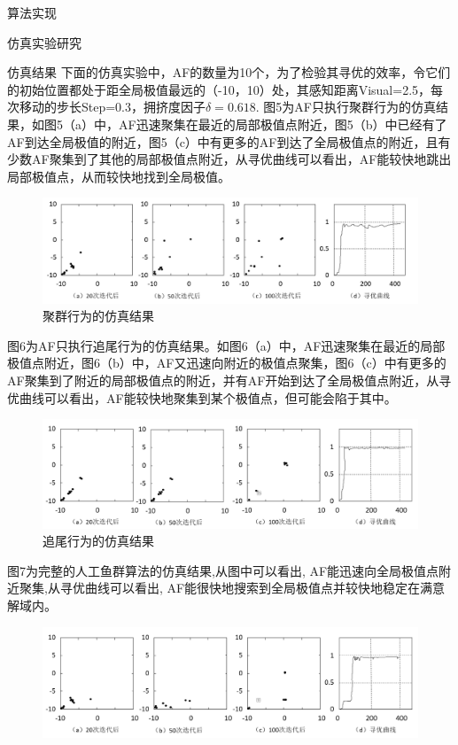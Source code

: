 \documentclass[UTF8]{ctexart}
\begin{document}
\begin{section}{算法实现}
\begin{subsection}{仿真实验研究}
\begin{subsubsection}{仿真结果}
	下面的仿真实验中，AF的数量为10个，为了检验其寻优的效率，令它们的初始位置都处于距全局极值最远的（-10，10）处，其感知距离Visual=2.5，每次移动的步长Step=0.3，拥挤度因子$\delta = 0.618$.
图5为AF只执行聚群行为的仿真结果，如图5（a）中，AF迅速聚集在最近的局部极值点附近，图5（b）中已经有了AF到达全局极值的附近，图5（c）中有更多的AF到达了全局极值点的附近，且有少数AF聚集到了其他的局部极值点附近，从寻优曲线可以看出，AF能较快地跳出局部极值点，从而较快地找到全局极值。
\begin{figure}[H]
\includegraphics[width=1.0\textwidth]{../../pic/fish11.png}
\caption{聚群行为的仿真结果}
\end{figure}
图6为AF只执行追尾行为的仿真结果。如图6（a）中，AF迅速聚集在最近的局部极值点附近，图6（b）中，AF又迅速向附近的极值点聚集，图6（c）中有更多的AF聚集到了附近的局部极值点的附近，并有AF开始到达了全局极值点附近，从寻优曲线可以看出，AF能较快地聚集到某个极值点，但可能会陷于其中。
\begin{figure}[H]
\includegraphics[width=1.0\textwidth]{../../pic/fish12.png}
\caption{追尾行为的仿真结果}
\end{figure}
图7为完整的人工鱼群算法的仿真结果,从图中可以看出, AF能迅速向全局极值点附近聚集,从寻优曲线可以看出, AF能很快地搜索到全局极值点并较快地稳定在满意解域内。
\begin{figure}[H]
\includegraphics[width=1.0\textwidth]{../../pic/fish13.png}

\end{figure}
\end{subsubsection}
\end{subsection}
\end{section}
\end{document}
